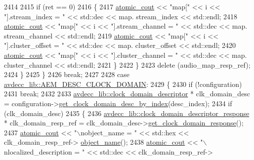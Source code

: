 \begin{DoxyCode}
2414 
2415                 \textcolor{keywordflow}{if} (ret == 0)
2416                 \{
2417                     \hyperlink{cmd__line_8h_a0bc38ccc65c79ba06c6fcd7b4bf554c3}{atomic\_cout} << \textcolor{stringliteral}{"map["} << i << \textcolor{stringliteral}{"].stream\_index = "} << std::dec << map.
      stream\_index << std::endl;
2418                     \hyperlink{cmd__line_8h_a0bc38ccc65c79ba06c6fcd7b4bf554c3}{atomic\_cout} << \textcolor{stringliteral}{"map["} << i << \textcolor{stringliteral}{"].stream\_channel = "} << std::dec << map.
      stream\_channel << std::endl;
2419                     \hyperlink{cmd__line_8h_a0bc38ccc65c79ba06c6fcd7b4bf554c3}{atomic\_cout} << \textcolor{stringliteral}{"map["} << i << \textcolor{stringliteral}{"].cluster\_offset = "} << std::dec << map.
      cluster\_offset << std::endl;
2420                     \hyperlink{cmd__line_8h_a0bc38ccc65c79ba06c6fcd7b4bf554c3}{atomic\_cout} << \textcolor{stringliteral}{"map["} << i << \textcolor{stringliteral}{"].cluster\_channel = "} << std::dec << map.
      cluster\_channel << std::endl;
2421                 \}
2422             \}
2423             \textcolor{keyword}{delete} (audio\_map\_resp\_ref);
2424         \}
2425     \}
2426     \textcolor{keywordflow}{break};
2427 
2428     \textcolor{keywordflow}{case} \hyperlink{namespaceavdecc__lib_ac7b7d227e46bc72b63ee9e9aae15902fa9a2f5c4896329bb03b27b36e98ed5e93}{avdecc\_lib::AEM\_DESC\_CLOCK\_DOMAIN}:
2429     \{
2430         \textcolor{keywordflow}{if} (!configuration)
2431             \textcolor{keywordflow}{break};
2432 
2433         \hyperlink{classavdecc__lib_1_1clock__domain__descriptor}{avdecc\_lib::clock\_domain\_descriptor} * clk\_domain\_desc = 
      configuration->\hyperlink{classavdecc__lib_1_1configuration__descriptor_ab5603e0fa2cc0695b240fe856b62776d}{get\_clock\_domain\_desc\_by\_index}(desc\_index);
2434         \textcolor{keywordflow}{if} (clk\_domain\_desc)
2435         \{
2436             \hyperlink{classavdecc__lib_1_1clock__domain__descriptor__response}{avdecc\_lib::clock\_domain\_descriptor\_response} * 
      clk\_domain\_resp\_ref = clk\_domain\_desc->\hyperlink{classavdecc__lib_1_1clock__domain__descriptor_a2c3eca99d20f1396befa4e71e438593c}{get\_clock\_domain\_response}();
2437             \hyperlink{cmd__line_8h_a0bc38ccc65c79ba06c6fcd7b4bf554c3}{atomic\_cout} << \textcolor{stringliteral}{"\(\backslash\)nobject\_name = "} << std::hex << clk\_domain\_resp\_ref->
      \hyperlink{classavdecc__lib_1_1descriptor__response__base_a133f7774946d80f82b8aaaa4cfbb7361}{object\_name}();
2438             \hyperlink{cmd__line_8h_a0bc38ccc65c79ba06c6fcd7b4bf554c3}{atomic\_cout} << \textcolor{stringliteral}{"\(\backslash\)nlocalized\_description = "} << std::dec << clk\_domain\_resp\_ref->

\end{DoxyCode}

